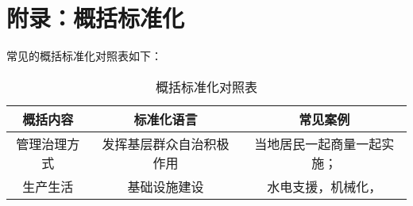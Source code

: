 \section{附录：概括标准化}
\label{appendix::1}
常见的概括标准化对照表如下：

\begin{table}[htbp]
    \centering
    \begin{tabular}{|c|c|c|}
        \hline
        \textbf{概括内容} & \textbf{标准化语言} & \textbf{常见案例} \\
        \hline
        \hline
        管理治理方式        & 发挥基层群众自治积极作用   & 当地居民一起商量一起实施； \\
        \hline
        生产生活          & 基础设施建设         & 水电支援，机械化，     \\
        \hline
    \end{tabular}
    \caption{概括标准化对照表}
    \label{tab:standardization}
\end{table}